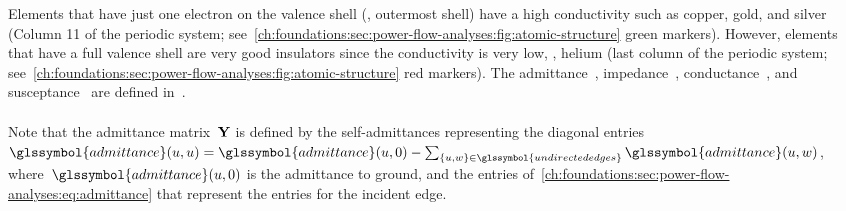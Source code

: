 Elements that have just one electron on the valence shell (\ie, outermost shell)
have a high conductivity such as copper, gold, and silver (Column 11 of the
periodic system;
see~\cref{ch:foundations:sec:power-flow-analyses:fig:atomic-structure}
green markers). However, elements that have a full valence shell are very good
insulators since the conductivity is very low, \eg, helium (last column of the
periodic system;
see~\cref{ch:foundations:sec:power-flow-analyses:fig:atomic-structure} red
markers). The admittance~,
impedance~, conductance~, and
susceptance~ are defined
in~.
% 
\begin{align}
    
\end{align}

Note that the admittance matrix~$\mathbf{Y}$ is defined by
the self-admittances representing the diagonal entries~$\glssymbol{admittance}
(\vertexa,\vertexa) = \glssymbol{admittance}(\vertexa,0) -
\sum_{\{\vertexa,\vertexc\}\in\glssymbol{undirectededges}}\glssymbol{admittance}
(\vertexa,\vertexc)$, where~$\glssymbol{admittance}(\vertexa,0)$ is the
admittance to ground, and the entries
of~\cref{ch:foundations:sec:power-flow-analyses:eq:admittance} that represent
the entries for the incident edge.
% 
